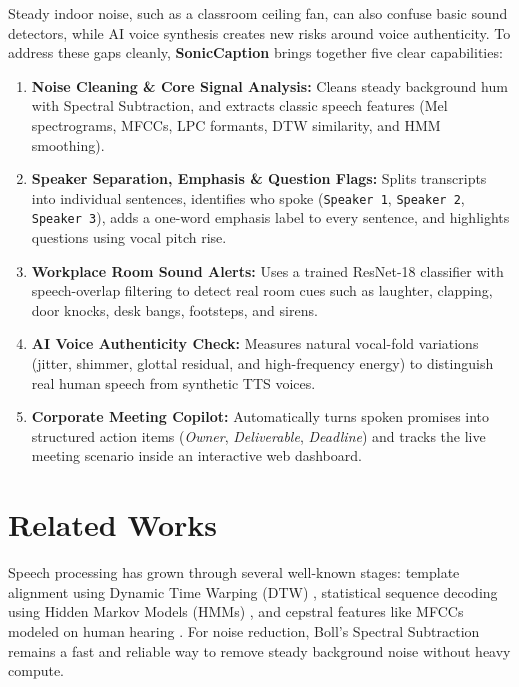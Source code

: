 \documentclass[letterpaper,12pt]{article}
\begin{document}
Steady indoor noise, such as a classroom ceiling fan, can also confuse basic sound detectors, while AI voice synthesis creates new risks around voice authenticity. To address these gaps cleanly, \textbf{SonicCaption} brings together five clear capabilities:
\begin{enumerate}
    \item \textbf{Noise Cleaning \& Core Signal Analysis:} Cleans steady background hum with Spectral Subtraction, and extracts classic speech features (Mel spectrograms, MFCCs, LPC formants, DTW similarity, and HMM smoothing).
    \item \textbf{Speaker Separation, Emphasis \& Question Flags:} Splits transcripts into individual sentences, identifies who spoke (\texttt{Speaker 1}, \texttt{Speaker 2}, \texttt{Speaker 3}), adds a one-word emphasis label to every sentence, and highlights questions using vocal pitch rise.
    \item \textbf{Workplace Room Sound Alerts:} Uses a trained ResNet-18 classifier with speech-overlap filtering to detect real room cues such as laughter, clapping, door knocks, desk bangs, footsteps, and sirens.
    \item \textbf{AI Voice Authenticity Check:} Measures natural vocal-fold variations (jitter, shimmer, glottal residual, and high-frequency energy) to distinguish real human speech from synthetic TTS voices.
    \item \textbf{Corporate Meeting Copilot:} Automatically turns spoken promises into structured action items (\textit{Owner}, \textit{Deliverable}, \textit{Deadline}) and tracks the live meeting scenario inside an interactive web dashboard.
\end{enumerate}

\section{Related Works}
Speech processing has grown through several well-known stages: template alignment using Dynamic Time Warping (DTW) \cite{sakoe1978dynamic}, statistical sequence decoding using Hidden Markov Models (HMMs) \cite{rabiner1989tutorial, rabiner1993fundamentals}, and cepstral features like MFCCs modeled on human hearing \cite{davis1980comparison}. For noise reduction, Boll's Spectral Subtraction \cite{boll1979suppression} remains a fast and reliable way to remove steady background noise without heavy compute.
\end{document}
